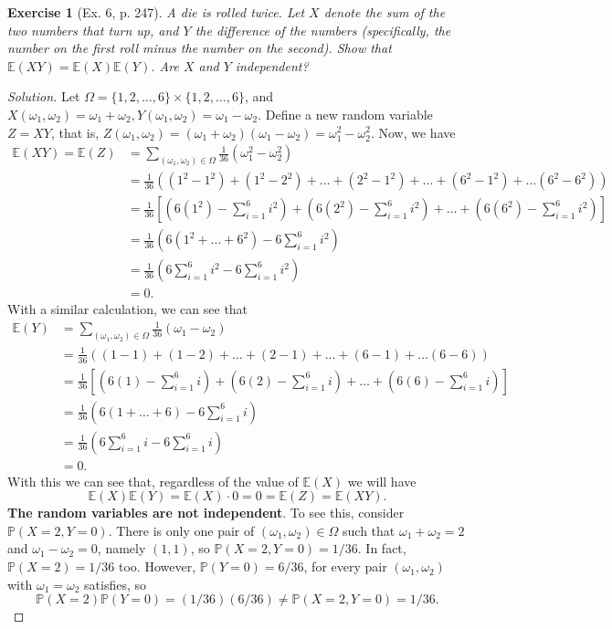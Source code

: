 \documentclass[letterpaper, 10 pt, conference]{article}
\newtheorem{ex}{Exercise}
\newcommand\E{\ensuremath{\mathbb{E}}}
\renewcommand{\P}{\ensuremath{\mathbb{P}}}
\newcommand\Om{\ensuremath{\Omega}}
\newcommand{\w}{\ensuremath{\omega}}
\begin{document}
\begin{ex}[Ex. 6, p. 247]
	A die is rolled twice. Let $X$ denote the sum of the two numbers that turn up, and $Y$ the difference of the numbers (specifically, the number on the first roll minus the number on the second). Show that $\E(XY) = \E(X) \E(Y)$. Are $X$ and $Y$ independent?
\end{ex}
\begin{proof}[Solution]
	Let $\Om = \lbrace 1, 2, \dots, 6\rbrace \times  \lbrace 1, 2, \dots, 6\rbrace$, and $X(\w_1 , \w_2) = \w_1 + \w_2, Y(\w_1, \w_2) = \w_1 - \w_2$. Define a new random variable $Z = XY$, that is, $Z(\w_1, \w_2) = (\w_1 + \w_2)(\w_1 - \w_2) = \w_{1}^{2} - \w_{2}^{2}$. Now, we have
	\begin{align}
		\E(XY) = \E(Z) &= \sum_{(\w_1, \w_2) \in \Om} \frac{1}{36} (\w_{1}^{2} - \w_{2}^{2})\\
		&= \frac{1}{36} \left( (1^2 - 1^2) + (1^2 - 2^2) + \dots + (2^2 - 1^2) + \dots + (6^2 - 1^2) + \dots (6^2 - 6^2) \right)\\
		&= \frac{1}{36} \left\lbrack \left(6(1^2) - \sum_{i = 1}^{6} i^2\right) + \left(6(2^2) - \sum_{i= 1}^{6} i^2\right) + \dots + \left(6(6^2) - \sum_{i=1}^{6} i^2\right)\right\rbrack\\
		&= \frac{1}{36} \left( 6(1^2 + \dots + 6^2) -6 \sum_{i=1}^{6} i^2\right)\\
		&= \frac{1}{36} \left(6 \sum_{i=1}^{6} i^2 - 6 \sum_{i=1}^{6} i^2\right)\\
		&= 0.
	\end{align}
 With a similar calculation, we can see that
 	\begin{align}
	\E(Y) &= \sum_{(\w_1, \w_2) \in \Om} \frac{1}{36} (\w_{1} - \w_{2})\\
	 &= \frac{1}{36} \left( (1-1) + (1-2) + \dots + (2-1) + \dots + (6-1) + \dots (6-6) \right)\\
	 &= \frac{1}{36} \left\lbrack \left(6(1) - \sum_{i = 1}^{6} i\right) + \left(6(2) - \sum_{i= 1}^{6} i\right) + \dots + \left(6(6) - \sum_{i=1}^{6} i\right)\right\rbrack\\
	 &= \frac{1}{36} \left( 6(1 + \dots + 6) -6 \sum_{i=1}^{6} i\right)\\
	 &= \frac{1}{36} \left(6 \sum_{i=1}^{6} i - 6 \sum_{i=1}^{6} i\right)\\
	 &= 0.
 \end{align}
 With this we can see that, regardless of the value of $\E(X)$ we will have 
  \begin{equation}
  	\E(X) \E(Y) = \E(X) \cdot 0 = 0 = \E(Z) = \E(XY).
  \end{equation}
  \textbf{The random variables are not independent}. To see this, consider $\P(X = 2, Y = 0)$. There is only one pair of $(\w_1, \w_2) \in \Om$ such that $\w_1 + \w_2 = 2$ and $\w_1 - \w_2 = 0$, namely $(1,1)$, so $\P(X = 2, Y = 0) = 1/36$. In fact, $\P(X = 2) = 1/36$ too. However, $\P(Y = 0) = 6/36$, for every pair $(\w_1, \w_2)$ with $\w_1 = \w_2$ satisfies, so 
  \begin{equation}
  	\P(X = 2) \P(Y = 0) = (1/36)(6/36) \neq \P(X = 2, Y = 0) = 1/36.
  \end{equation}
\end{proof}
\end{document}
